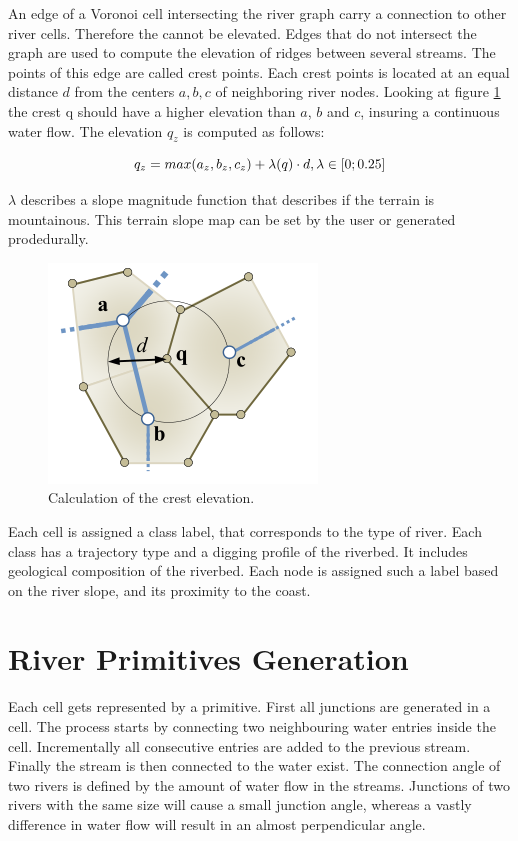 An edge of a Voronoi cell intersecting the river graph carry a connection to other river cells. Therefore the cannot be elevated. Edges that do not intersect the graph are used to compute the elevation of ridges between several streams. The points of this edge are called crest points. Each crest points is located at an equal distance $d$ from the centers $a, b, c$ of neighboring river nodes. Looking at figure \ref{fig:crest} the crest q should have a higher elevation than $a$, $b$ and $c$, insuring a continuous water flow. The elevation $q_z$ is computed as follows: 

$$q_z = max(a_z, b_z, c_z) + \lambda(q) \cdot d, \\ \lambda \in [0; 0.25]$$ 

$\lambda$ describes a slope magnitude function that describes if the terrain is mountainous. This terrain slope map can be set by the user or generated prodedurally. 
\begin{figure}[htb]
	\centering
	\includegraphics[width=\linewidth]{GGG13/crest}
	\caption{Calculation of the crest elevation.}
	\label{fig:crest}
\end{figure}

Each cell is assigned a class label, that corresponds to the type of river. Each class has a trajectory type and a digging profile of the riverbed. It includes geological composition of the riverbed. Each node is assigned such a label based on the river slope, and its proximity to the coast. 

\section{River Primitives Generation}
Each cell gets represented by a primitive. First all junctions are generated in a cell. The process starts by connecting two neighbouring water entries inside the cell. Incrementally all consecutive entries are added to the previous stream. Finally the stream is then connected to the water exist. The connection angle of two rivers is defined by the amount of water flow in the streams. Junctions of two rivers with the same size will cause a small junction angle, whereas a vastly difference in water flow will result in an almost perpendicular angle. 
